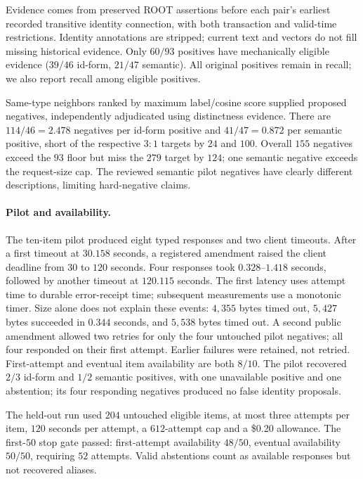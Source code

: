 Evidence comes from preserved ROOT assertions before each pair's earliest
recorded transitive identity connection, with both transaction and valid-time
restrictions. Identity annotations are stripped; current text and vectors do
not fill missing historical evidence. Only $60/93$ positives have mechanically
eligible evidence ($39/46$ id-form, $21/47$ semantic). All original positives
remain in recall; we also report recall among eligible positives.

Same-type neighbors ranked by maximum label/cosine score supplied proposed
negatives, independently adjudicated using distinctness evidence. There are
$114/46=2.478$ negatives per id-form positive and $41/47=0.872$ per semantic
positive, short of the respective $3{:}1$ targets by $24$ and $100$.
Overall $155$ negatives exceed the $93$ floor but miss the $279$ target by $124$;
one semantic negative exceeds the request-size cap. The reviewed semantic pilot
negatives have clearly different descriptions, limiting hard-negative claims.

\paragraph{Pilot and availability.}
The ten-item pilot produced eight typed responses and two client timeouts.
After a first timeout at $30.158$ seconds, a registered amendment raised the
client deadline from $30$ to $120$ seconds. Four responses took
$0.328$--$1.418$ seconds, followed by another timeout at $120.115$ seconds.
The first latency uses attempt time to durable error-receipt time; subsequent
measurements use a monotonic timer. Size alone does not explain these events:
$4{,}355$ bytes timed out, $5{,}427$ bytes succeeded in $0.344$ seconds, and
$5{,}538$ bytes timed out. A second public amendment allowed two retries for
only the four untouched pilot negatives; all four responded on their first
attempt. Earlier failures were retained, not retried. First-attempt and eventual
item availability are both $8/10$. The pilot recovered $2/3$ id-form and $1/2$
semantic positives, with one unavailable positive and one abstention; its four
responding negatives produced no false identity proposals.

The held-out run used $204$ untouched eligible items, at most three attempts per
item, $120$ seconds per attempt, a $612$-attempt cap and a \$0.20 allowance.
The first-$50$ stop gate passed: first-attempt availability $48/50$, eventual
availability $50/50$, requiring $52$ attempts. Valid abstentions count as
available responses but not recovered aliases.


